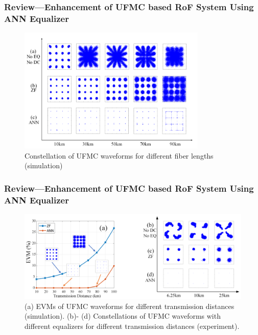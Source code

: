 \documentclass[t]{beamer}
\begin{document}
\begin{frame}
    \frametitle{Review---Enhancement of UFMC based RoF System Using ANN Equalizer \cite{Liu2019}}
    \begin{figure}
        \includegraphics[width=0.8\textwidth]{ANNEqualizerConstellation.PNG}
        \caption{Constellation of UFMC waveforms for different fiber lengths (simulation)}
    \end{figure}
\end{frame}

\begin{frame}
    \frametitle{Review---Enhancement of UFMC based RoF System Using ANN Equalizer \cite{Liu2019}}
    \begin{figure}
        \includegraphics[width=\textwidth]{ANNEqualizerResult.PNG}
        \caption{(a) EVMs of UFMC waveforms for different transmission distances (simulation). (b)- (d) Constellations of UFMC waveforms with different equalizers for different transmission distances (experiment).}
    \end{figure}
\end{frame}
\end{document}
